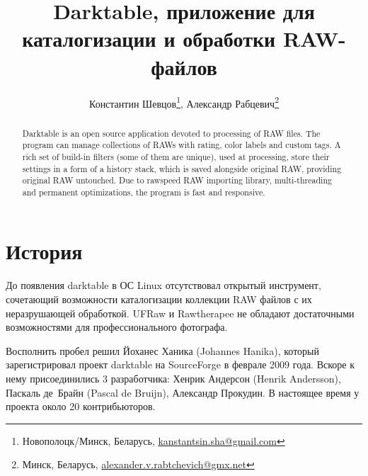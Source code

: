 \documentclass[10pt, a5paper]{article}
\begin{document}
\title{Darktable, приложение для каталогизации и обработки RAW-файлов}
\author{Константин Шевцов\footnote{Новополоцк/Минск, Беларусь, \url{kanstantsin.sha@gmail.com}}, Александр Рабцевич\footnote{Минск, Беларусь, \url{alexander.v.rabtchevich@gmx.net}}}
\date{}

\def\progref!#1!{\texttt{#1}}

\maketitle

\begin{abstract}
Darktable is an open source application devoted to processing of RAW files. The program can manage collections of RAWs with rating, color labels and custom tags. A rich set of build-in filters (some of them are unique), used at processing, store their settings in a form of a history stack, which is saved alongside original RAW, providing original RAW untouched. Due to rawspeed RAW importing library, multi-threading and permanent optimizations, the program is fast and responsive.
\end{abstract}

\section*{История}

До появления darktable в ОС Linux отсутствовал открытый инструмент, сочетающий возможности каталогизации коллекции RAW файлов с их неразрушающей обработкой. UFRaw и  Rawtherapee не обладают достаточными возможностями для профессионального фотографа.

Восполнить пробел решил Йоханес Ханика (Johannes Hanika), который зарегистрировал проект darktable на SourceForge в феврале 2009 года. Вскоре к нему присоединились 3 разработчика: Хенрик Андерсон (Henrik Andersson), Паскаль де Брайн (Pascal de Bruijn), Александр Прокудин. В настоящее время у проекта около 20 контрибьюторов. 
\end{document}
